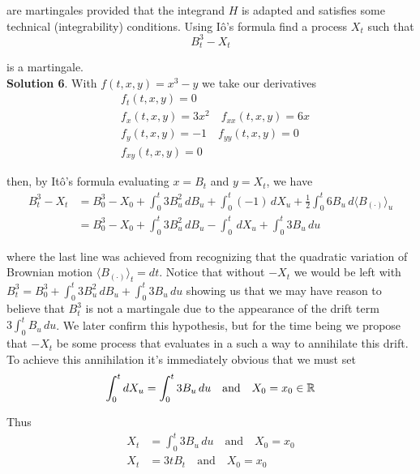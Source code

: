 \documentclass[12pt]{article}
\begin{document}
are martingales provided that the integrand $H$ is adapted and satisfies some technical (integrability) conditions. Using I\^{o}'s formula find a process $X_t$ such that
\begin{equation*}
	B^3_t - X_t
\end{equation*}

is a martingale. \\

{\bf Solution 6}. With $f(t,x,y) = x^3 - y$ we take our derivatives
\begin{align*}
	&f_t(t,x,y) = 0 \\
	&f_x(t,x,y) = 3x^2 \quad f_{xx}(t,x,y) = 6x \\
	&f_y(t,x,y) = -1 \quad f_{yy}(t,x,y) = 0 \\
	&f_{xy}(t,x,y) = 0
\end{align*} 

then, by It\^{o}'s formula evaluating $x = B_t$ and $y = X_t$, we have
\begin{align*}
	B_t^3 - X_t &= B^3_0 - X_0 + \int^t_0 3B_u^2\,dB_u + \int^t_0 (-1)\,dX_u + \frac{1}{2}\int^t_0 6B_u\,d\langle B_{(\cdot)}\rangle_u \\
	&= B^3_0 - X_0 + \int^t_0 3B_u^2\,dB_u - \int^t_0 \,dX_u + \int^t_0 3B_u\,du
\end{align*}

where the last line was achieved from recognizing that the quadratic variation of Brownian motion $\langle B_{(\cdot)}\rangle_t = dt$. Notice that without $-X_t$ we would be left with $B_t^3 = B^3_0 + \int^t_0 3B_u^2\,dB_u + \int^t_0 3B_u\,du$ showing us that we may have reason to believe that $B_t^3$ is not a martingale due to the appearance of the drift term $3\int^t_0 B_u\,du$. We later confirm this hypothesis, but for the time being we propose that $-X_t$ be some process that evaluates in a such a way to annihilate this drift. To achieve this annihilation it's immediately obvious that we must set 
\begin{equation*}
	\int^t_0 dX_u = \int^t_0 3B_u\,du \quad \text{and} \quad X_0 = x_0 \in \mathbb R\\
\end{equation*}

Thus
\begin{align*}
	X_t &= \int^t_0 3B_u\,du \quad \text{and} \quad X_0 = x_0 \\
	X_t &= 3tB_t \quad \text{and} \quad X_0 = x_0
\end{align*}
\end{document}
